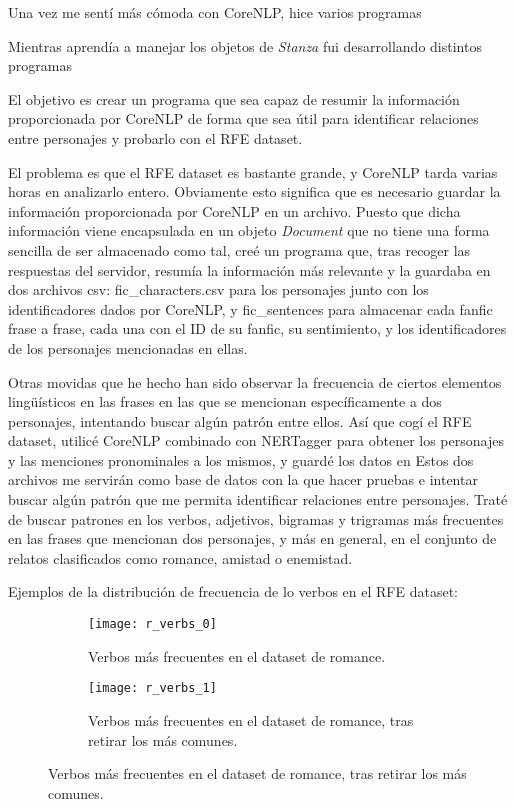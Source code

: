 \documentclass{pre-tfg}
\begin{document}
Una vez me sentí más cómoda con CoreNLP, hice varios programas 

Mientras aprendía a manejar los objetos de \textit{Stanza} fui desarrollando distintos programas 

El objetivo es crear un programa que sea capaz de resumir la información proporcionada por CoreNLP de forma que sea útil para identificar relaciones entre personajes y probarlo con el RFE dataset.

El problema es que el RFE dataset es bastante grande, y CoreNLP tarda varias horas en analizarlo entero. Obviamente esto significa que es necesario guardar la información proporcionada por CoreNLP en un archivo. Puesto que dicha información viene encapsulada en un objeto \textit{Document} que no tiene una forma sencilla de ser almacenado como tal, creé un programa que, tras recoger las respuestas del servidor, resumía la información más relevante y la guardaba en dos archivos csv: fic\_characters.csv para los personajes junto con los identificadores dados por CoreNLP, y fic\_sentences para almacenar cada fanfic frase a frase, cada una con el ID de su fanfic, su sentimiento, y los identificadores de los personajes mencionadas en ellas.


Otras movidas que he hecho han sido observar la frecuencia de ciertos elementos lingüísticos en las frases en las que se mencionan específicamente a dos personajes, intentando buscar algún patrón entre ellos. Así que cogí el RFE dataset, utilicé CoreNLP combinado con NERTagger para obtener los personajes y las menciones pronominales a los mismos, y guardé los datos en 
Estos dos archivos me servirán como base de datos con la que hacer pruebas e intentar buscar algún patrón que me permita identificar relaciones entre personajes. Traté de buscar patrones en los verbos, adjetivos, bigramas y trigramas más frecuentes en las frases que mencionan dos personajes, y más en general, en el conjunto de relatos clasificados como romance, amistad o enemistad.

Ejemplos de la distribución de frecuencia de lo verbos en el RFE dataset:

\begin{figure}
	\centering
	\begin{subfigure}{\textwidth}
		\texttt{[image: r\_verbs\_0]}
		\caption{Verbos más frecuentes en el dataset de romance.}
		\label{fig:r_verb_freq_in_dataset}
		
	\end{subfigure}
	\begin{subfigure}{\textwidth}
		\texttt{[image: r\_verbs\_1]}
		\caption{Verbos más frecuentes en el dataset de romance, tras retirar los más comunes.}
		\label{fig:r_verb_freq_removed}
	\end{subfigure}
	
	
\end{figure}
\end{document}
